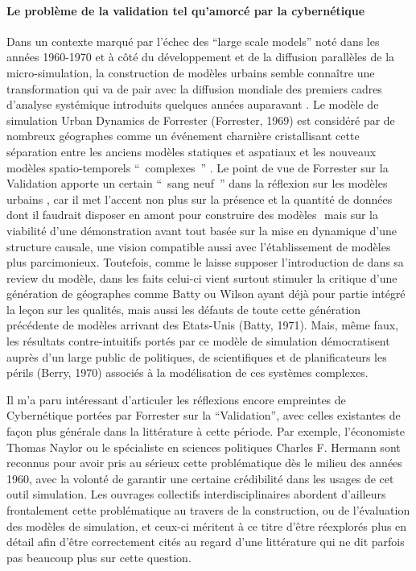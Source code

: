\paragraph*{Le problème de la validation tel qu’amorcé par la cybernétique}

Dans un contexte marqué par l'échec des \foreignquote{english}{large scale models} noté dans les années 1960-1970 \autocite{Lee1973} et à côté du développement et de la diffusion parallèles de la micro-simulation, la construction de modèles urbains semble connaître une transformation qui va de pair avec la diffusion mondiale des premiers cadres d'analyse systémique introduits quelques années auparavant \autocites{Ackerman1963, Harvey1969, Berry1964a, Chorley1962, Haggett1965}⁠. Le modèle de simulation Urban Dynamics de Forrester (Forrester, 1969)⁠ est considéré par de nombreux géographes comme un événement charnière cristallisant cette séparation entre les anciens modèles statiques et aspatiaux et les nouveaux modèles spatio-temporels \enquote{ complexes } \autocites{Batty1976, Batty2005}. Le point de vue de Forrester sur la Validation apporte un certain \enquote{ sang neuf } dans la réflexion sur les modèles urbains \autocite{Lee1973}⁠, car il met l'accent non plus sur la présence et la quantité de données dont il faudrait disposer en amont pour construire des modèles \autocite[355]{Batty1976}⁠ mais sur la viabilité d'une démonstration avant tout basée sur la mise en dynamique d'une structure causale, une vision compatible aussi avec l'établissement de modèles plus parcimonieux. Toutefois, comme le laisse supposer l'introduction de \textcite{Tobler1970a}  dans sa review du modèle, dans les faits celui-ci vient surtout stimuler la critique d'une génération de géographes comme Batty ou Wilson ayant déjà pour partie intégré la leçon sur les qualités, mais aussi les défauts de toute cette génération précédente de modèles arrivant des Etats-Unis (Batty, 1971)⁠. Mais, même faux, les résultats contre-intuitifs portés par ce modèle de simulation démocratisent auprès d'un large public de politiques, de scientifiques et de planificateurs les périls (Berry, 1970)⁠ associés à la modélisation de ces systèmes complexes.

Il m'a paru intéressant d'articuler les réflexions encore empreintes de Cybernétique portées par Forrester sur la \enquote{Validation}, avec celles existantes de façon plus générale dans la littérature à cette période. Par exemple, l'économiste Thomas Naylor ou le spécialiste en sciences politiques Charles F. Hermann \autocites{Naylor1966,Naylor1967, Naylor1969, Hermann1967} sont reconnus \autocites{Nance2002, Balci1986} ⁠pour avoir pris au sérieux cette problématique dès le milieu des années 1960, avec la volonté de garantir une certaine crédibilité dans les usages de cet outil simulation. Les ouvrages collectifs interdisciplinaires \autocites{Guetzkow1972, Dutton1971}  abordent d'ailleurs frontalement cette problématique au travers de la construction, ou de l'évaluation des modèles de simulation, et ceux-ci méritent à ce titre d'être réexplorés plus en détail afin d'être correctement cités au regard d'une littérature qui ne dit parfois pas beaucoup plus sur cette question. 

